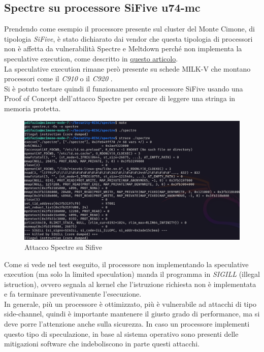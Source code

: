 \subsection*{Spectre su processore SiFive u74-mc}
Prendendo come esempio il processore presente sul cluster del Monte Cimone, di tipologia \textit{SiFive}, è stato dichiarato dai vendor che questa tipologia di processori non è affetta da vulnerabilità Spectre e Meltdown perché non implementa la speculative execution, come descritto in \href{https://www.sifive.com/blog/sifive-statement-on-meltdown-and-spectre}{questo articolo}.\\
La speculative execution rimane però presente su schede MILK-V che montano processori come il \textit{C910} o il \textit{C920} \cite{c910c920}.\\
\newline
Si è potuto testare quindi il funzionamento sul processore SiFive usando una Proof of Concept dell'attacco Spectre \cite{securityrisc} per cercare di leggere una stringa in memoria protetta.
\FloatBarrier
\vspace{1cm}
\begin{figure}[!htbp]
    \centering
    \includegraphics[width=1\linewidth]{images/strace-sifive.png}
    \caption{Attacco Spectre su Sifive}
\end{figure}
\vspace{1cm}
\FloatBarrier
Come si vede nel test eseguito, il processore non implementando la speculative execution (ma solo la limited speculation) manda il programma in \textit{SIGILL} (illegal istruction), ovvero segnala al kernel che l'istruzione richiesta non è implementata e fa terminare preventivamente l'esecuzione.\\
In generale, più un processore è ottimizzato, più è vulnerabile ad attacchi di tipo side-channel, quindi è importante mantenere il giusto grado di performance, ma si deve porre l'attenzione anche sulla sicurezza. In caso un processore implementi questo tipo di speculazione, in base al sistema operativo sono presenti delle mitigazioni software che indeboliscono in parte questi attacchi.
